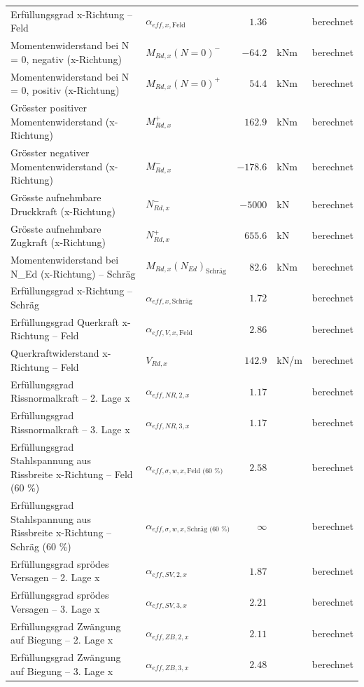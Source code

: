 \documentclass[11pt,a4paper]{article}
\begin{document}
\begin{xltabular}{\linewidth}{>{\raggedright\arraybackslash}Xlrll}
Erfüllungsgrad x-Richtung – Feld & $\alpha_{eff,x,\text{Feld}}$ & $1.36$ &  & berechnet \\
Momentenwiderstand bei N = 0, negativ (x-Richtung) & $M_{Rd,x}(N=0)^{-}$ & $-64.2$ & kNm & berechnet \\
Momentenwiderstand bei N = 0, positiv (x-Richtung) & $M_{Rd,x}(N=0)^{+}$ & $54.4$ & kNm & berechnet \\
Grösster positiver Momentenwiderstand (x-Richtung) & $M_{Rd,x}^{+}$ & $162.9$ & kNm & berechnet \\
Grösster negativer Momentenwiderstand (x-Richtung) & $M_{Rd,x}^{-}$ & $-178.6$ & kNm & berechnet \\
Grösste aufnehmbare Druckkraft (x-Richtung) & $N_{Rd,x}^{-}$ & $-5000$ & kN & berechnet \\
Grösste aufnehmbare Zugkraft (x-Richtung) & $N_{Rd,x}^{+}$ & $655.6$ & kN & berechnet \\
Momentenwiderstand bei N\_Ed (x-Richtung) – Schräg & $M_{Rd,x}(N_{Ed})_{\text{Schräg}}$ & $82.6$ & kNm & berechnet \\
Erfüllungsgrad x-Richtung – Schräg & $\alpha_{eff,x,\text{Schräg}}$ & $1.72$ &  & berechnet \\
Erfüllungsgrad Querkraft x-Richtung – Feld & $\alpha_{eff,V,x,\text{Feld}}$ & $2.86$ &  & berechnet \\
Querkraftwiderstand x-Richtung – Feld & $V_{Rd,x}$ & $142.9$ & kN/m & berechnet \\
Erfüllungsgrad Rissnormalkraft – 2. Lage x & $\alpha_{eff,NR,2,x}$ & $1.17$ &  & berechnet \\
Erfüllungsgrad Rissnormalkraft – 3. Lage x & $\alpha_{eff,NR,3,x}$ & $1.17$ &  & berechnet \\
Erfüllungsgrad Stahlspannung aus Rissbreite x-Richtung – Feld (60 \%) & $\alpha_{eff,\sigma,w,x,\text{Feld (60 \%)}}$ & $2.58$ &  & berechnet \\
Erfüllungsgrad Stahlspannung aus Rissbreite x-Richtung – Schräg (60 \%) & $\alpha_{eff,\sigma,w,x,\text{Schräg (60 \%)}}$ & $\infty$ &  & berechnet \\
Erfüllungsgrad sprödes Versagen – 2. Lage x & $\alpha_{eff,SV,2,x}$ & $1.87$ &  & berechnet \\
Erfüllungsgrad sprödes Versagen – 3. Lage x & $\alpha_{eff,SV,3,x}$ & $2.21$ &  & berechnet \\
Erfüllungsgrad Zwängung auf Biegung – 2. Lage x & $\alpha_{eff,ZB,2,x}$ & $2.11$ &  & berechnet \\
Erfüllungsgrad Zwängung auf Biegung – 3. Lage x & $\alpha_{eff,ZB,3,x}$ & $2.48$ &  & berechnet \\

\end{xltabular}
\end{document}
